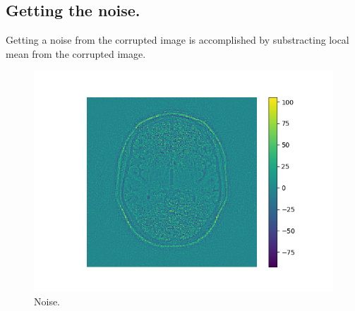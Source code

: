 \subsection*{Getting the noise.}
Getting a noise from the corrupted image is accomplished by substracting local mean from the corrupted image.
\begin{figure}[H]
	\centering{}
		\includegraphics[scale=0.7]{figures/module03/70_szum}
	\caption{Noise.} 
\end{figure}
